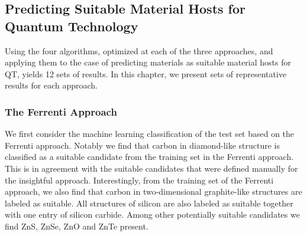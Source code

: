 \documentclass[superscriptaddress,unsortedaddress,
 amsmath,amssymb,
 aps,
]{revtex4-2}
\begin{document}
\subsection*{Predicting Suitable Material Hosts for Quantum Technology}

Using the four algorithms, optimized at each of the three approaches, and applying them to the case of predicting materials as suitable material hosts for QT, yields 12 sets of results. In this chapter, we present sets of representative results for each approach. 

\subsubsection*{The Ferrenti Approach}
We first consider the machine learning classification of the test set based on the Ferrenti approach. 
Notably we find that carbon in diamond-like structure is classified as a suitable candidate from the training set in the Ferrenti approach. 
This is in agreement with the suitable candidates that were defined manually for the insightful approach. 
Interestingly, from the training set of the Ferrenti approach, we also find that carbon in two-dimensional graphite-like structures are labeled as suitable. 
All structures of silicon are also labeled as suitable together with one entry of silicon carbide. 
Among other potentially suitable candidates we find ZnS, ZnSe, ZnO and ZnTe present. 

%
% 
%


\end{document}
